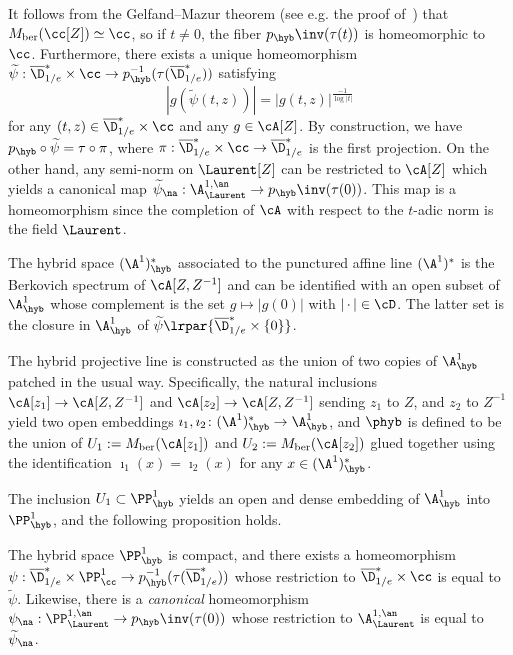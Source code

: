 It follows from the Gelfand--Mazur theorem (see e.g. the proof of~\cite[Prop.~1.1]{degeneration}) that $M_{\mathrm{ber}}(\cc[Z]) \simeq \cc$, so if $t\neq 0$, the fiber $p_{\hyb}\inv(\tau(t))$ is homeomorphic to $\cc$. Furthermore, there exists a unique homeomorphism $\widetilde \psi: \overline{\D}^*_{1/e} \times \cc \to p_{\hyb}^{-1}(\tau (\overline{\D}^*_{1/e})) $ satisfying
\begin{equation}\label{eq:identify}
|g(\widetilde\psi(t,z))| = |g(t,z)|^{\frac{-1}{\log \mathopen| t \mathclose|}}
\end{equation}
for any $(t,z) \in \overline{\D}^*_{1/e} \times \cc $ and any $g\in \cA[Z]$. By construction, we have $ p_{\hyb} \circ \widetilde\psi=\tau \circ \pi$, where $\pi: \overline{\D}^*_{1/e} \times \cc \to\overline{\D}^*_{1/e} $ is the first projection. On the other hand, any semi-norm on $\Laurent[Z]$ can be restricted to $\cA[Z]$ which yields a canonical map $\widetilde\psi_{\na}: \A^{1,\an}_{\Laurent} \to p_{\hyb}\inv(\tau(0))$. This map is a homeomorphism since the completion of $\cA$ with respect to the $t$-adic norm is the field $\Laurent$.


The hybrid space $(\A^1)^*_{\hyb}$ associated to the punctured affine line $(\A^1)^*$ is the Berkovich spectrum of $\cA[Z,Z^{-1}]$ and can be identified with an open subset of $\A^1_{\hyb}$ whose complement is the set $ g \mapsto |g(0)|$ with $|{\,\cdot\,}| \in \cD$. The latter set is the closure in $\A^1_{\hyb}$ of $\widetilde{\psi}\lrpar{\overline{\D}^*_{1/e} \times \{0\} }$.


The hybrid projective line is constructed as the union of two copies of $\A^1_{\hyb}$ patched in the usual way. Specifically, the natural inclusions $ \cA[z_1] \to \cA[Z,Z^{-1}]$ and $\cA[z_2] \to \cA[Z,Z^{-1}]$ sending $z_1$ to $Z$, and $z_2$ to $Z^{-1}$ yield two open embeddings $\imath_1, \imath_2\colon(\A^1)^*_{\hyb} \to \A^1_{\hyb}$, and $\phyb$ is defined to be the union of $U_1:=M_{\mathrm{ber}}(\cA[z_1])$ and $U_2 :=M_{\mathrm{ber}}(\cA[z_2])$ glued together using the identification $\imath_1(x) = \imath_2(x)$ for any $x\in (\A^1)^*_{\hyb}$.

The inclusion $U_1 \subset \PP^1_{\hyb}$ yields an open and dense embedding of $\A^1_{\hyb}$ into $\PP^1_{\hyb}$, and the following proposition holds.
\begin{prop}
The hybrid space $\PP^1_{\hyb}$ is compact, and there exists a homeomorphism $\psi: \overline{\D}^*_{1/e} \times \PP^1_\cc \to p_{\hyb}^{-1}(\tau (\overline{\D}^*_{1/e})) $ whose restriction to $\overline{\D}^*_{1/e} \times \cc $ is equal to $\widetilde \psi $. Likewise, there is a \emph{canonical} homeomorphism $\psi_\na: \PP^{1,\an}_{\Laurent} \to p_{\hyb}\inv(\tau(0))$ whose restriction to $\A^{1,\an}_{\Laurent}$ is equal to $\widetilde \psi_{\na}$.
\end{prop}

